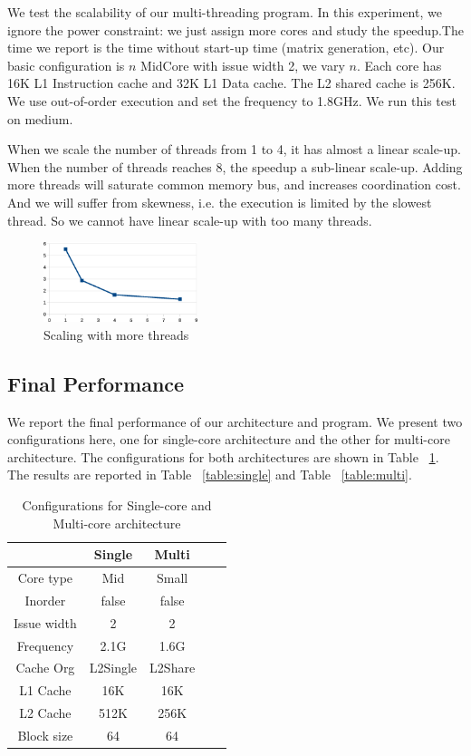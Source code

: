 \documentclass[twocolumn,letterpaper,10pt]{article}
\begin{document}
We test the scalability of our multi-threading program. In this
experiment, we ignore the power constraint: we just assign more cores
and study the speedup.The time we report is the time without start-up time (matrix generation, etc). Our basic
configuration is $n$ MidCore with issue width 2, we vary $n$. Each core
has 16K L1 Instruction cache and 32K L1 Data cache. The L2 shared
cache is 256K. We use out-of-order execution and set the frequency to
1.8GHz. We run this test on medium.

When we scale the number of threads from 1 to 4, it has almost a linear
scale-up. When the number of threads reaches 8, the speedup a sub-linear
scale-up. Adding more threads will saturate common memory bus, and
increases coordination cost. And we will suffer from skewness, i.e. the
execution is limited by the slowest thread. So we cannot have linear
scale-up with too many threads.

\begin{figure}[ht!]
\centering
\includegraphics[width=0.4\textwidth]{figures/scale2.eps}
\caption{Scaling with more threads}
\end{figure}

\subsection{Final Performance}
We report the final performance of our architecture and program. We
present two configurations here, one for single-core architecture and the
other for multi-core architecture. The configurations for both architectures
are shown in Table ~\ref{table:config}. The results are reported in Table ~\ref{table:single} and Table ~\ref{table:multi}.

\begin{table}[ht!]
\begin{center}
\begin{tabular}{ccccc}
\toprule
& Single & Multi \\
\midrule
Core type & Mid & Small \\
Inorder & false & false \\
Issue width & 2 & 2 \\
Frequency & 2.1G & 1.6G \\
Cache Org & L2Single & L2Share \\
L1 Cache & 16K & 16K \\
L2 Cache & 512K & 256K \\
Block size & 64 & 64 \\
\bottomrule
\end{tabular}
\end{center}
\caption{Configurations for Single-core and Multi-core architecture}
\label{table:config}
\end{table}
\end{document}
